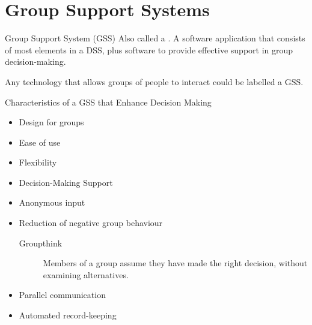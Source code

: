 \documentclass[\main/notes.tex]{subfiles}
\begin{document}
		\section{Group Support Systems}
			\begin{definition}{Group Support System (GSS)}
				Also called a . A software application that consists of most elements in a DSS, plus software to provide effective support in group decision-making.

				Any technology that allows groups of people to interact could be labelled a GSS.
			\end{definition}
			\begin{sidenote}{Characteristics of a GSS that Enhance Decision Making}
				\begin{itemize}[nosep]
					\item Design for groups
					\item Ease of use
					\item Flexibility
					\item Decision-Making Support
					\item Anonymous input
					\item Reduction of negative group behaviour
						\begin{description}
							\item[Groupthink] Members of a group assume they have made the right decision, without examining alternatives.
						\end{description}
					\item Parallel communication
					\item Automated record-keeping
				\end{itemize}
			\end{sidenote}

	\vbox{}
\end{document}
